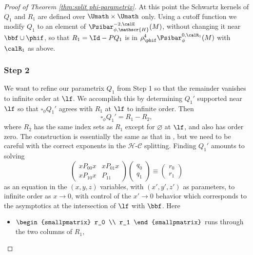 \begin{proof}[Proof of Theorem \ref{thm:split phi-parametrix}]
At this point the Schwartz kernels of $Q_1$ and $R_1$ are defined over $\Umath\times\Umath$ only. Using a cutoff function we modify $Q_1$ to an element of $\Psibar_{\phi, \mathscr{H}}^{-2,\calE}(M)$, without changing it near $\bbf\cup\phif$, so that $R_1=\Id-PQ_1$ is in $\rho_\phif^4\Psibar_\phi^{0,\calR_1}(M)$ with $\calR_1$ as above.

\subsubsection*{Step 2}
We want to refine our parametrix $Q_1$ from Step 1 so that the remainder vanishes to
infinite order at $\lf$. We accomplish this by determining $Q_1'$ supported near~$\lf$ so that $\square_\phi Q_1'$ agrees with $R_1$ at $\lf$ to infinite order. Then
\begin{equation}
\label{eqn:Q1' eqn}
\square_\phi Q_1' = R_1 - R_2,
\end{equation}
where $R_2$ has the same index sets as $R_1$ except for $\varnothing$ at $\lf$, and also has order zero.
The construction is essentially the same as that in \cite[Lem.\,5.44]{melrose1993atiyah},
but we need to be careful with the correct exponents in the $\mathscr{H}$-$\mathscr{C}$ splitting.
Finding $Q_1'$ amounts to solving
\begin{equation}
\label{eqn:remove boundary terms}
\begin{pmatrix}
xP_{00}x & xP_{01}x \\
xP_{10}x & P_{11}
\end{pmatrix}
\begin{pmatrix}
q_0\\ q_1
\end{pmatrix}
\equiv
\begin{pmatrix}
r_0 \\
r_1
\end{pmatrix}
\end{equation}
as an equation in the $(x,y,z)$ variables, with $(x',y',z')$ as parameters,
to infinite order as $x\to0$, with control of the $x'\to0$ behavior which corresponds to
the asymptotics at the intersection of $\lf$ with $\bbf$. Here
\begin{itemize}
\item $\begin{smallpmatrix} r_0 \\ r_1 \end{smallpmatrix}$ runs through the two columns of $R_1$,


\end{itemize}
\end{proof}
